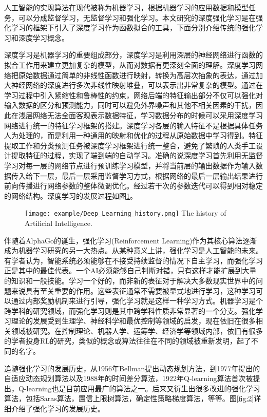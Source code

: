 人工智能的实现算法在现代被称为机器学习，根据机器学习的应用数据和模型任务，可以分成监督学习，无监督学习和强化学习。本文研究的深度强化学习是在强化学习的框架下引入了深度学习作为函数拟合的工具，下面分别介绍传统的强化学习和深度学习概念。

深度学习是机器学习的重要组成部分，深度学习是利用深层的神经网络进行函数的拟合工作用来建立更加复杂的模型，从而对数据有更深刻全面的理解。深度学习网络把原始数据通过简单的非线性函数进行映射，转换为高层次抽象的表达，通过加大神经网络的深度进行多次非线性映射堆叠，可以表示出非常复杂的模型。通过在学习过程中引入紧缩性和鲁棒性的约束，网络后端的特征输出部分不仅可以强化对输入数据的区分和预测能力，同时可以避免外界噪声和其他不相关因素的干扰，因此在浅层网络无法全面客观表示数据特征，学习数据分布的时候可以采用深度学习网络进行统一的特征学习框架的搭建。深度学习各层的输入特征不是根据具体任务人为处理的，而是利用一种通用的映射和优化的过程从原始数据中学习得到。特征提取工作和分类预测任务被深度学习框架进行统一整合，避免了繁琐的人类手工设计提取特征的过程，实现了端到端的自动学习。准确的说深度学习首先利用无监督学习对每一层的网络节点进行预训练学习模型，并将当前层的输出数据作为输入数据传入给下一层，最后一层采用监督学习方式，根据网络的最后一层输出结果进行前向传播进行网络参数的整体微调优化。经过若干次的参数迭代可以得到相对稳定的网络结构。深度学习的发展过程如图\ref{fig:test}。
\begin{figure}[htpb]
	\centering
	\texttt{[image: example/Deep\_Learning\_history.png]}
	{The history of Artificial Intelligence.}
	\label{fig:test}
\end{figure}

伴随着AlphaGo的诞生，强化学习(Reinforcement Learning)作为其核心算法逐渐成为机器学习研究的另一大热点。从某种意义上讲，强化学习是人工智能的未来。有学者认为，智能系统必须能够在不接受持续监督的情况下自主学习，而强化学习正是其中的最佳代表。一个AI必须能够自己判断对错，只有这样才能扩展到大量的知识和一般技能。学习一个好的，而非新的表征对于解决大多数现实世界中的问题来说具有至关重要的作用。这些表征通常不需要被显式地进行学习，这种学习可以通过内部奖励机制来进行引导，强化学习就是这样一种学习方式。机器学习是个跨学科的研究领域，而强化学习则是其中跨学科性质非常显著的一个分支。强化学习理论的发展受到生理学、神经科学和最优控制等领域的启发，现在依旧在很多相关领域被研究。在控制理论、机器人学、运筹学、经济学等领域内部，依旧有很多的学者投身RL的研究，类似的概念或算法往往在不同的领域被重新发明，起了不同的名字。

追随强化学习的发展历史，从1956年Bellman提出动态规划方法，到1977年提出的自适应动态规划算法以及1988年的时间差分算法，1922年Q-learning算法首次被提出，Q-learning也是目前应用最广的算法之一。后来又衍生出很多改进的强化学习算法，包括Saras算法，置信上限树算法，确定性策略梯度算法，等等。图\ref{fig:2}详细介绍了强化学习的发展历史。


